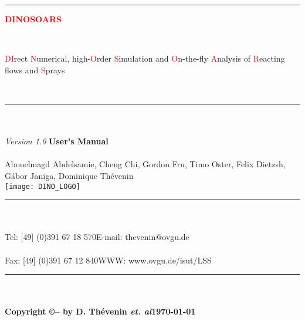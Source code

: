 \thispagestyle{empty}

%
{\noindent \rule{\textwidth}{2.0pt}}
{\noindent\fontsize{30}{32}\selectfont\par\vspace*{0.5cm}\textcolor{red}{\textbf{DINOSOARS}}}\\

{\noindent \fontsize{30}{32}\selectfont\par\vspace*{0.5cm}
\textcolor{red}{DI}rect \textcolor{red}{N}umerical,
high-\textcolor{red}{O}rder \textcolor{red}{S}imulation and \textcolor{red}{O}n-the-fly \textcolor{red}{A}nalysis of \textcolor{red}{R}eacting flows and \textcolor{red}{S}prays
}\\

%
{\noindent \rule{\textwidth}{2.0pt}}\\\\
%
\vspace*{0.5cm}
\emph{\color{blue} Version 1.0}
\vfill
%
{\noindent \Huge \textbf{User's Manual}}\\\\
{Abouelmagd Abdelsamie, Cheng Chi, Gordon Fru, Timo Oster, Felix Dietzsh, G\'abor Janiga, Dominique Th\'evenin }\\
%
\vspace{1.0cm}
\bc \texttt{[image: DINO\_LOGO]} \ec
\vfill
%
\noindent
{\noindent  \rule{\textwidth}{2.0pt}}\\\\
Tel: [49] (0)391 67 18 570\hfill E-mail: thevenin@ovgu.de\\\\
Fax: [49] (0)391 67 12 840\hfill WWW: www.ovgu.de/isut/LSS\\
{\noindent  \rule{\textwidth}{2.0pt}}\\\\
\vspace*{0.2cm}
\textbf{Copyright \copyright -- \the\year\quad by D. Th\'evenin {\it et. al}\hfill \today}
